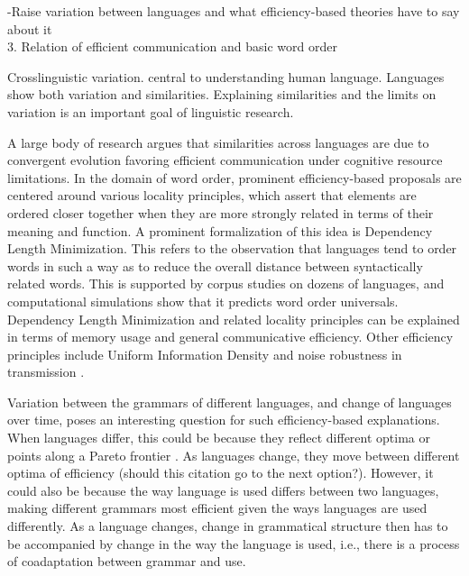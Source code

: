 \documentclass[11pt,a4paper]{article}
\begin{document}
-Raise variation between languages and what efficiency-based theories have to say about it\\

{\color{blue}3. Relation of efficient communication and basic word order}

Crosslinguistic variation. central to understanding human language.
\cite{greenberg-universals-1963} 
Languages show both variation and similarities.
Explaining similarities and the limits on variation is an important goal of linguistic research.



A large body of research argues that similarities across languages are due to convergent evolution favoring efficient communication under cognitive resource limitations.
In the domain of word order, prominent efficiency-based proposals are centered around various locality principles, which assert that elements are ordered closer together when they are more strongly related in terms of their meaning and function.
A prominent formalization of this idea is Dependency Length Minimization.
This refers to the observation that languages tend to order words in such a way as to reduce the overall distance between syntactically related words.
This is supported by corpus studies on dozens of languages, and computational simulations show that it predicts word order universals.
Dependency Length Minimization and related locality principles can be explained in terms of memory usage and general communicative efficiency.
Other efficiency principles include Uniform Information Density \cite{...} and noise robustness in transmission \cite{gibson-noisy-channel-2013}.

Variation between the grammars of different languages, and change of languages over time, poses an interesting question for such efficiency-based explanations.
When languages differ, this could be because they reflect different optima or points along a Pareto frontier \cite{zaslavsky2018efficient, hahn2020universals}.
As languages change, they move between different optima of efficiency \cite{zaslavsky2019evolution} (should this citation go to the next option?).
However, it could also be because the way language is used differs between two languages, making different grammars most efficient given the ways languages are used differently.
As a language changes, change in grammatical structure then has to be accompanied by change in the way the language is used, i.e., there is a process of coadaptation between grammar and use.
\end{document}
